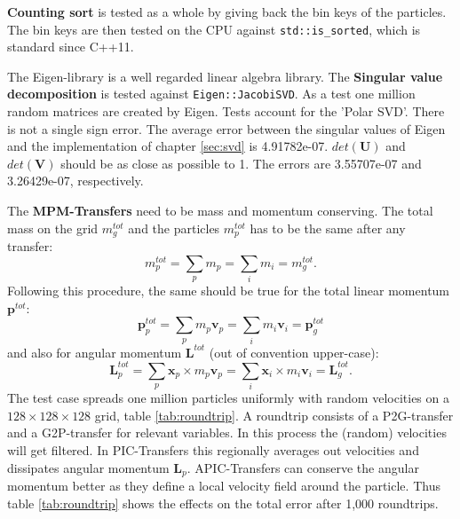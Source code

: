 \documentclass[m,times]{cgMA}
\begin{document}
\textbf{Counting sort} is tested as a whole by giving back the bin keys of the particles. The bin keys are then tested on the CPU against \texttt{std::is\_sorted}, which is standard since C++11.

The Eigen-library \cite{EIGEN:LIBRARY} is a well regarded linear algebra library. The \textbf{Singular value decomposition} is tested against \texttt{Eigen::JacobiSVD}. As a test one million random matrices are created by Eigen. Tests account for the 'Polar SVD'. There is not a single sign error. The average error between the singular values of Eigen and the implementation of chapter \ref{sec:svd} is 4.91782e-07. $det(\boldsymbol{U})$ and $det(\boldsymbol{V})$ should be as close as possible to 1. The errors are 3.55707e-07 and 3.26429e-07, respectively.

The \textbf{MPM-Transfers} need to be mass and momentum conserving. The total mass on the grid $m_g^{tot}$ and the particles $m_p^{tot}$ has to be the same after any transfer:
\begin{equation}
  m_{p}^{tot}= \sum_p m_p =  \sum_i m_i = m_{g}^{tot}.
\end{equation}
Following this procedure, the same should be true for the total linear momentum $\boldsymbol{p}^{tot}$:
\begin{equation}
  \boldsymbol{p}_{p}^{tot}= \sum_p m_p \boldsymbol{v}_p=  \sum_i m_i \boldsymbol{v}_i = \boldsymbol{p}_{g}^{tot}
\end{equation}
and also for angular momentum $\boldsymbol{L}^{tot}$ (out of convention upper-case):
\begin{equation}
  \boldsymbol{L}_{p}^{tot}= \sum_p \boldsymbol{x}_p \times m_p \boldsymbol{v}_p =  \sum_i \boldsymbol{x}_i \times m_i \boldsymbol{v}_i = \boldsymbol{L}_{g}^{tot}.
\end{equation}
The test case spreads one million particles uniformly with random velocities on a $128\times128\times128$ grid, table \ref{tab:roundtrip}. A roundtrip consists of a P2G-transfer and a G2P-transfer for relevant variables. In this process the (random) velocities will get filtered. In PIC-Transfers this regionally averages out velocities and dissipates angular momentum $\boldsymbol{L}_p$. APIC-Transfers can conserve the angular momentum better as they define a local velocity field around the particle. Thus table \ref{tab:roundtrip} shows the effects on the total error after 1,000 roundtrips.
\end{document}
